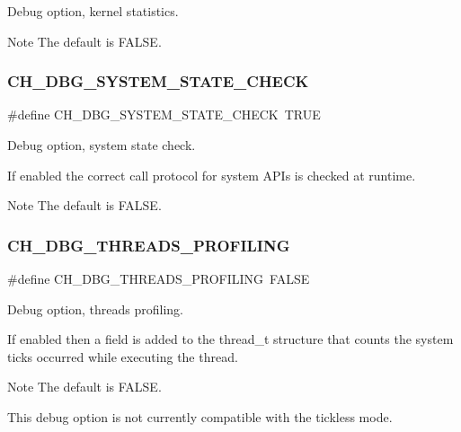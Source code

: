 Debug option, kernel statistics. 

\begin{DoxyNote}{Note}
The default is {\ttfamily F\+A\+L\+SE}. 
\end{DoxyNote}
\hypertarget{group__config_ga10db71bc25605169dddc82c1604b0a16}{}\label{group__config_ga10db71bc25605169dddc82c1604b0a16} 
\subsubsection{\texorpdfstring{C\+H\+\_\+\+D\+B\+G\+\_\+\+S\+Y\+S\+T\+E\+M\+\_\+\+S\+T\+A\+T\+E\+\_\+\+C\+H\+E\+CK}{CH\_DBG\_SYSTEM\_STATE\_CHECK}}
{\footnotesize\ttfamily \#define C\+H\+\_\+\+D\+B\+G\+\_\+\+S\+Y\+S\+T\+E\+M\+\_\+\+S\+T\+A\+T\+E\+\_\+\+C\+H\+E\+CK~T\+R\+UE}



Debug option, system state check. 

If enabled the correct call protocol for system A\+P\+Is is checked at runtime.

\begin{DoxyNote}{Note}
The default is {\ttfamily F\+A\+L\+SE}. 
\end{DoxyNote}
\hypertarget{group__config_gadc9c00c2e5b6e766ded8dfa77c0c90c1}{}\label{group__config_gadc9c00c2e5b6e766ded8dfa77c0c90c1} 
\subsubsection{\texorpdfstring{C\+H\+\_\+\+D\+B\+G\+\_\+\+T\+H\+R\+E\+A\+D\+S\+\_\+\+P\+R\+O\+F\+I\+L\+I\+NG}{CH\_DBG\_THREADS\_PROFILING}}
{\footnotesize\ttfamily \#define C\+H\+\_\+\+D\+B\+G\+\_\+\+T\+H\+R\+E\+A\+D\+S\+\_\+\+P\+R\+O\+F\+I\+L\+I\+NG~F\+A\+L\+SE}



Debug option, threads profiling. 

If enabled then a field is added to the {\ttfamily thread\+\_\+t} structure that counts the system ticks occurred while executing the thread.

\begin{DoxyNote}{Note}
The default is {\ttfamily F\+A\+L\+SE}. 

This debug option is not currently compatible with the tickless mode. 
\end{DoxyNote}
